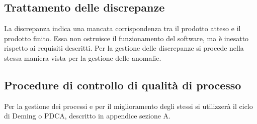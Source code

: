 \subsection{Trattamento delle discrepanze}
\label{3.2}
La discrepanza indica una mancata corrispondenza tra il prodotto atteso e il prodotto finito. Essa non ostruisce il funzionamento del software, ma è inesatto rispetto ai requisiti descritti. Per la gestione delle discrepanze si procede nella stessa maniera vista per la gestione delle anomalie.
\subsection{Procedure di controllo di qualità di processo}
Per la gestione dei processi e per il miglioramento degli stessi si utilizzerà il ciclo di Deming o PDCA, descritto in appendice sezione A.
\label{3.3}






